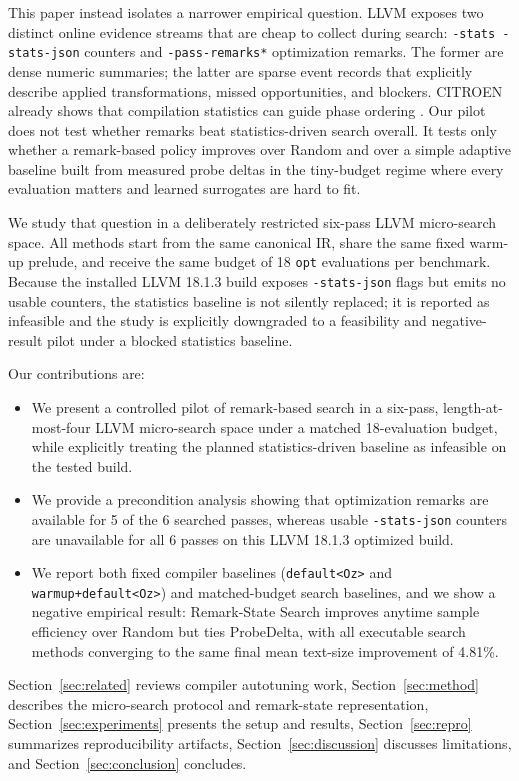 \documentclass{article}
\newcommand{\method}{Remark-State Search}
\begin{document}
This paper instead isolates a narrower empirical question. LLVM exposes two distinct online evidence streams that are cheap to collect during search: \texttt{-stats -stats-json} counters and \texttt{-pass-remarks*} optimization remarks. The former are dense numeric summaries; the latter are sparse event records that explicitly describe applied transformations, missed opportunities, and blockers. CITROEN already shows that compilation statistics can guide phase ordering \citep{zhao2025citroen}. Our pilot does not test whether remarks beat statistics-driven search overall. It tests only whether a remark-based policy improves over Random and over a simple adaptive baseline built from measured probe deltas in the tiny-budget regime where every evaluation matters and learned surrogates are hard to fit.

We study that question in a deliberately restricted six-pass LLVM micro-search space. All methods start from the same canonical IR, share the same fixed warm-up prelude, and receive the same budget of 18 \texttt{opt} evaluations per benchmark. Because the installed LLVM 18.1.3 build exposes \texttt{-stats-json} flags but emits no usable counters, the statistics baseline is not silently replaced; it is reported as infeasible and the study is explicitly downgraded to a feasibility and negative-result pilot under a blocked statistics baseline.

Our contributions are:
\begin{itemize}
  \item We present a controlled pilot of remark-based search in a six-pass, length-at-most-four LLVM micro-search space under a matched 18-evaluation budget, while explicitly treating the planned statistics-driven baseline as infeasible on the tested build.
  \item We provide a precondition analysis showing that optimization remarks are available for 5 of the 6 searched passes, whereas usable \texttt{-stats-json} counters are unavailable for all 6 passes on this LLVM 18.1.3 optimized build.
  \item We report both fixed compiler baselines (\texttt{default<Oz>} and \texttt{warmup+default<Oz>}) and matched-budget search baselines, and we show a negative empirical result: \method{} improves anytime sample efficiency over Random but ties ProbeDelta, with all executable search methods converging to the same final mean text-size improvement of 4.81\%.
\end{itemize}

Section~\ref{sec:related} reviews compiler autotuning work, Section~\ref{sec:method} describes the micro-search protocol and remark-state representation, Section~\ref{sec:experiments} presents the setup and results, Section~\ref{sec:repro} summarizes reproducibility artifacts, Section~\ref{sec:discussion} discusses limitations, and Section~\ref{sec:conclusion} concludes.
\end{document}
